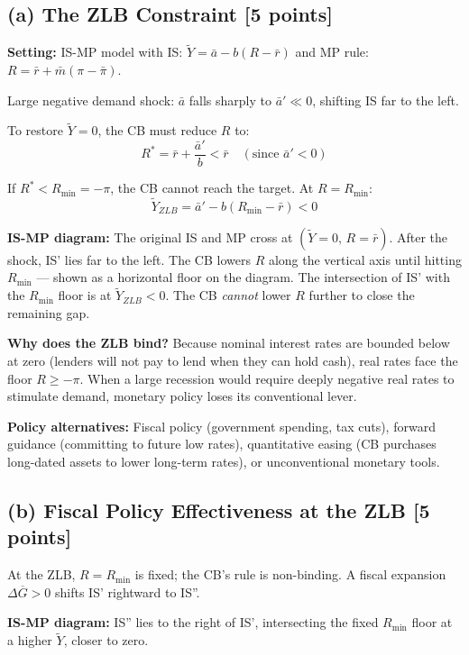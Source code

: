 \documentclass[letterpaper,12pt]{article}
\begin{document}
\subsection*{(a) The ZLB Constraint [5 points]}

\noindent\textbf{Setting:} IS-MP model with IS: $\widetilde{Y} = \bar{a} - b(R-\bar{r})$ and MP rule: $R = \bar{r} + \bar{m}(\pi-\bar{\pi})$.

Large negative demand shock: $\bar{a}$ falls sharply to $\bar{a}' \ll 0$, shifting IS far to the left.

To restore $\widetilde{Y}=0$, the CB must reduce $R$ to:
\[
R^* = \bar{r} + \frac{\bar{a}'}{b} < \bar{r} \quad (\text{since } \bar{a}' < 0)
\]

If $R^* < R_{\min} = -\pi$, the CB cannot reach the target. At $R = R_{\min}$:
\[
\widetilde{Y}_{ZLB} = \bar{a}' - b(R_{\min} - \bar{r}) < 0
\]

\textbf{IS-MP diagram:} The original IS and MP cross at $(\widetilde{Y}=0,\, R=\bar{r})$. After the shock, IS' lies far to the left. The CB lowers $R$ along the vertical axis until hitting $R_{\min}$ — shown as a horizontal floor on the diagram. The intersection of IS' with the $R_{\min}$ floor is at $\widetilde{Y}_{ZLB} < 0$. The CB \emph{cannot} lower $R$ further to close the remaining gap.

\textbf{Why does the ZLB bind?} Because nominal interest rates are bounded below at zero (lenders will not pay to lend when they can hold cash), real rates face the floor $R \geq -\pi$. When a large recession would require deeply negative real rates to stimulate demand, monetary policy loses its conventional lever.

\textbf{Policy alternatives:} Fiscal policy (government spending, tax cuts), forward guidance (committing to future low rates), quantitative easing (CB purchases long-dated assets to lower long-term rates), or unconventional monetary tools.

\subsection*{(b) Fiscal Policy Effectiveness at the ZLB [5 points]}

At the ZLB, $R = R_{\min}$ is fixed; the CB's rule is non-binding. A fiscal expansion $\Delta\overline{G} > 0$ shifts IS' rightward to IS''.

\textbf{IS-MP diagram:} IS'' lies to the right of IS', intersecting the fixed $R_{\min}$ floor at a higher $\widetilde{Y}$, closer to zero.
\end{document}
